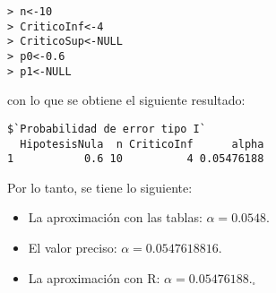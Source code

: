 \begin{solucion}
\begin{enumerate}
  \begin{verbatim}
> n<-10
> CriticoInf<-4
> CriticoSup<-NULL
> p0<-0.6
> p1<-NULL
  \end{verbatim}
  \vspace{-0.5cm}
  con lo que se obtiene el siguiente resultado:
  \begin{verbatim}
$`Probabilidad de error tipo I`
  HipotesisNula  n CriticoInf      alpha
1           0.6 10          4 0.05476188
  \end{verbatim}
  \vspace{-0.5cm}
  Por lo tanto, se tiene lo siguiente:
  \begin{itemize}
   \item La aproximaci\'on con las tablas: $\alpha = 0.0548$.
   \item El valor preciso: $\alpha = 0.0547618816$.
   \item La aproximaci\'on con R: $\alpha = 0.05476188$.${}_{\square}$
  \end{itemize}
  

\end{enumerate}
\end{solucion}

